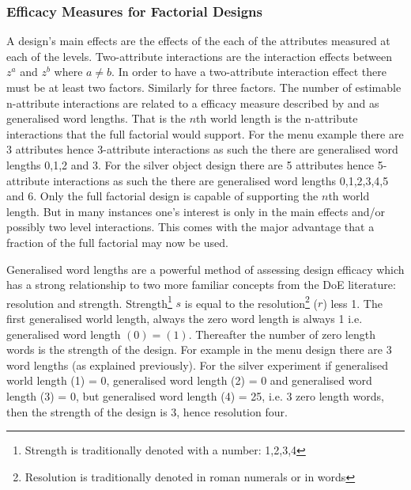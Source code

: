 \documentclass{article}
\begin{document}
\subsubsection{Efficacy Measures for Factorial Designs}

A design's main effects are the effects of the each of the attributes measured at each of the levels.
Two-attribute interactions are the interaction effects between $z^a$ and $z^b$ where $a \neq b$.
In order to have a two-attribute interaction effect there must be at least two factors.
Similarly for three factors.
The number of estimable n-attribute interactions are related to a efficacy measure described by \citet{xu2001generalized} and \citet{gromping2014generalized} as generalised word lengths.
That is the $n$th world length is the n-attribute interactions that the full factorial would support.
For the menu example there are 3 attributes hence 3-attribute interactions as such the there are generalised word lengths 0,1,2 and 3.
For the silver object design there are 5 attributes hence 5-attribute interactions as such the there are generalised word lengths 0,1,2,3,4,5 and 6.
Only the full factorial design is capable of supporting the $n$th world length.
But in many instances one's interest is only in the main effects and/or possibly two level interactions.
This comes with the major advantage that a fraction of the full factorial may now be used.

Generalised word lengths are a powerful method of assessing design efficacy which has a strong relationship to two more familiar concepts from the DoE literature: resolution and strength.
Strength\footnote{Strength is traditionally denoted with a number: 1,2,3,4} $s$ is equal to the resolution\footnote{Resolution is traditionally denoted in roman numerals or in words} ($r$) less 1.
The first generalised world length, always the zero word length is always 1 i.e. generalised word length $(0) = (1)$.
Thereafter the number of zero length words is the strength of the design.
For example in the menu design there are 3 word lengths (as explained previously).
For the silver experiment if generalised world length (1) = 0, generalised word length (2) = 0 and generalised word length (3) = 0, but generalised word length (4) = 25, i.e. 3 zero length words, then the strength of the design is 3, hence resolution four.
\end{document}
